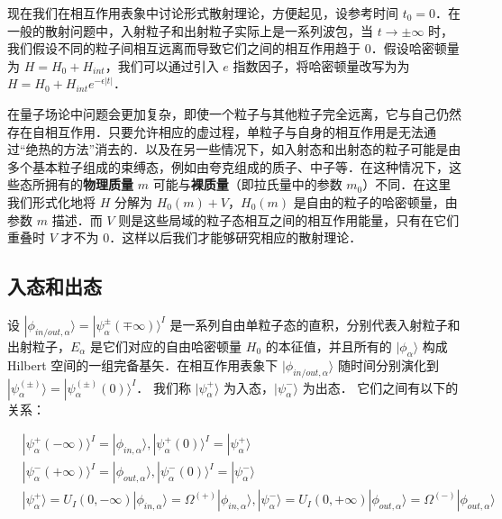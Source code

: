 
现在我们在相互作用表象中讨论形式散射理论，方便起见，设参考时间 $t_0=0$．在一般的散射问题中，入射粒子和出射粒子实际上是一系列波包，当 $t\rightarrow \pm\infty$ 时，我们假设不同的粒子间相互远离而导致它们之间的相互作用趋于 $0$．假设哈密顿量为 $H=H_0+H_{int}$，我们可以通过引入 $e$ 指数因子，将哈密顿量改写为为 $H=H_0+H_{int} e^{-\epsilon|t|}$．

在量子场论中问题会更加复杂，即使一个粒子与其他粒子完全远离，它与自己仍然存在自相互作用．只要允许相应的虚过程，单粒子与自身的相互作用是无法通过“绝热的方法”消去的．以及在另一些情况下，如入射态和出射态的粒子可能是由多个基本粒子组成的束缚态，例如由夸克组成的质子、中子等．在这种情况下，这些态所拥有的\textbf{物理质量} $m$ 可能与\textbf{裸质量}（即拉氏量中的参数 $m_0$）不同．在这里我们形式化地将 $H$ 分解为 $H_0(m)+V$，$H_0(m)$ 是自由的粒子的哈密顿量，由参数 $m$ 描述．而 $V$ 则是这些局域的粒子态相互之间的相互作用能量，只有在它们重叠时 $V$ 才不为 $0$．这样以后我们才能够研究相应的散射理论．

\subsection{入态和出态}
设 $|\phi_{in/out,\alpha}\rangle=|\psi_\alpha^{\pm}(\mp \infty)\rangle^I$ 是一系列自由单粒子态的直积，分别代表入射粒子和出射粒子，$E_\alpha$ 是它们对应的自由哈密顿量 $H_0$ 的本征值，并且所有的 $|\phi_\alpha\rangle$ 构成 Hilbert 空间的一组完备基矢．在相互作用表象下 $|\phi_{in/out,\alpha}\rangle$ 随时间分别演化到  $|\psi_\alpha^{(\pm)}\rangle=|\psi_\alpha^{(\pm)}(0)\rangle^I$．
我们称 $|\psi_\alpha^{+}\rangle$ 为入态，$|\psi_\alpha^{-}\rangle$ 为出态． 它们之间有以下的关系：

\begin{equation}
\begin{aligned}
&|\psi_\alpha^{+}(-\infty)\rangle^I=|\phi_{in,\alpha}\rangle,|\psi_\alpha^{+}(0)\rangle^I=|\psi_\alpha^{+}\rangle\\
&|\psi_\alpha^{-}(+\infty)\rangle^I=|\phi_{out,\alpha}\rangle,|\psi_\alpha^{-}(0)\rangle^I=|\psi_\alpha^{-}\rangle\\
&|\psi_\alpha^+\rangle=U_I(0,-\infty)|\phi_{in,\alpha}\rangle = \Omega^{(+)} |\phi_{in,\alpha}\rangle,
|\psi_\alpha^-\rangle=U_I(0,+\infty)|\phi_{out,\alpha} \rangle = \Omega^{(-)} |\phi_{out,\alpha}\rangle
\end{aligned}
\end{equation}

